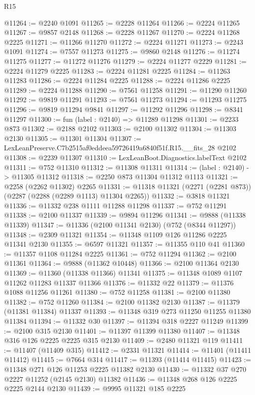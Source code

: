 \begin{lexlean}{R15}
\begin{coremodule}
@11264 := @2240 @1091
@11265 := @2228 @11264
@11266 := @2224 @11265
@11267 := @9857 @2148
@11268 := @2228 @11267
@11270 := @2224 @11268 @2225
@11271 := @11266 @11270
@11272 := @2224 @11271
@11273 := @2243 @1091
@11274 := @7557 @11273
@11275 := @9860 @2148
@11276 := @11274 @11275
@11277 := @11272 @11276
@11279 := @2224 @11277 @2229
@11281 := @2224 @11279 @2225
@11283 := @2224 @11281 @2225
@11284 := @11263 @11283
@11286 := @2224 @11284 @2225
@11288 := @2224 @11286 @2225
@11289 := @2224 @11288
@11290 := @7561 @11258
@11291 := @11290 @11260
@11292 := @9819 @11291
@11293 := @7561 @11273
@11294 := @11293 @11275
@11296 := @9819 @11294 @9841
@11297 := @11292 @11296
@11298 := @8341 @11297
@11300 := fun (label : @2140) => @11289 @11298
@11301 := @2233 @873
@11302 := @2188 @2102
@11303 := @2100 @11302
@11304 := @11303 @2130
@11305 := @11301 @11304
@11307 := LexLeanPreserve.C7b2515af0eddeea59726419a6840f51f.R15.__fits_28 @2102
@11308 := @2239 @11307
@11310 := LexLeanBoot.Diagnostics.labelText @2102
@11311 := @752 @11310
@11312 := @11308 @11311
@11314 := (label : @2140) -> @11305 @11312
@11318 := @2250 @873 @11304 @11312 @1113
@11321 := @2258 (@2262 @11302) @2265
@11331 := @11318 @11321 (@2271 (@2281 @873)) (@2287 (@2288 (@2289 @1113) @11304 @2265))
@11332 := @3818 @11321
@11336 := @11332 @238 @1111 @11288 @11298
@11337 := @752 @11291
@11338 := @2100 @11337
@11339 := @9894 @11296
@11341 := @9888 (@11338 @11339)
@11347 := @11336 (@2100 @11341 @2130) (@752 (@8344 @11297))
@11348 := @2309 @11321
@11354 := @11348 @1109 @126 @11286 @2225 @11341 @2130
@11355 := @6597 @11321
@11357 := @11355 @110 @41
@11360 := @11357 @1108 @11284 @2225
@11361 := @752 @11294
@11362 := @2100 @11361
@11364 := @9888 (@11362 @10448)
@11366 := @2100 @11364 @2130
@11369 := @11360 (@11338 @11366) @11341
@11375 := @11348 @1089 @1107 @11262 @11283 @11337 @11366
@11376 := @11332 @22
@11379 := @11376 @1088 @11256 @11261
@11380 := @752 @11258
@11381 := @2100 @11380
@11382 := @752 @11260
@11384 := @2100 @11382 @2130
@11387 := @11379 (@11381 @11384) @11337
@11393 := @11348 @319 @273 @11250 @11255 @11380 @11384
@11394 := @11332 @30
@11397 := @11394 @318 @2227 @11249
@11399 := @2100 @315 @2130
@11401 := @11397 @11399 @11380
@11407 := @11348 @316 @126 @2225 @2225 @315 @2130
@11409 := @2480 @11321 @119
@11411 := @11407 (@11409 @315)
@11412 := @2331 @11321
@11414 := @11401 (@11411 @11412)
@11415 := @7664 @314
@11417 := @11393 (@11414 @11415)
@11423 := @11348 @271 @126 @11253 @2225 @11382 @2130
@11430 := @11332 @37 @270 @2227 @11252 (@2145 @2130) @11382
@11436 := @11348 @268 @126 @2225 @2225 @2144 @2130
@11439 := @9995 @11321 @185 @2225

\end{coremodule}
\end{lexlean}

